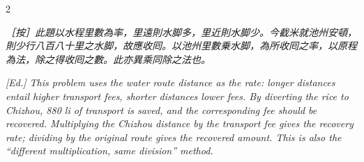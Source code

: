 \documentclass[11pt,a4paper]{article}
\newcommand{\EdNoteText}[1]{\par\noindent\textit{\color{ednotecolor}［按］#1}\par}
\newcommand{\EdNoteEn}[1]{\par\noindent\textit{\color{ednotecolor}[Ed.] #1}\par}
\begin{document}
\begin{paracol}{2}
\EdNoteText{此題以水程里數為率，里遠則水脚多，里近則水脚少。今截米就池州安頓，則少行八百八十里之水脚，故應收囘。以池州里數乗水脚，為所收囘之率，以原程為法，除之得收囘之數。此亦異乘同除之法也。}
\switchcolumn
\EdNoteEn{This problem uses the water route distance as the rate: longer distances entail higher transport fees, shorter distances lower fees. By diverting the rice to Chizhou, 880 li of transport is saved, and the corresponding fee should be recovered. Multiplying the Chizhou distance by the transport fee gives the recovery rate; dividing by the original route gives the recovered amount. This is also the ``different multiplication, same division'' method.}

\end{paracol}

\end{document}
